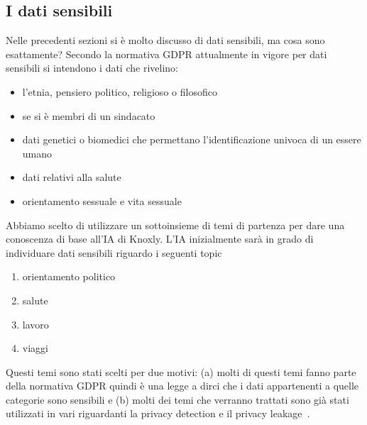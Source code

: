 \subsection{I dati sensibili}
\label{ssec:sensitive_data}
Nelle precedenti sezioni si è molto discusso di dati sensibili, ma cosa sono esattamente? Secondo la normativa GDPR attualmente in vigore per dati sensibili si intendono i dati che rivelino:
\begin{itemize}
    \item l'etnia, pensiero politico, religioso o filosofico
    \item se si è membri di un sindacato
    \item dati genetici o biomedici che permettano l'identificazione univoca di un essere umano
    \item dati relativi alla salute
    \item orientamento sessuale e vita sessuale
\end{itemize}
Abbiamo scelto di utilizzare un sottoinsieme di temi di partenza per dare una conoscenza di base all'IA di Knoxly. L'IA inizialmente sarà in grado di individuare dati sensibili riguardo i seguenti topic
\begin{enumerate}
    \item orientamento politico
    \item salute
    \item lavoro
    \item viaggi
\end{enumerate}
Questi temi sono stati scelti per due motivi: (a) molti di questi temi fanno parte della normativa GDPR quindi è una legge a dirci che i dati appartenenti a quelle categorie sono sensibili e (b) molti dei temi che verranno trattati sono già stati utilizzati in vari riguardanti la privacy detection e il privacy leakage~\cite{looseTweets, MalandrinoScarano, dontTweetThis}.